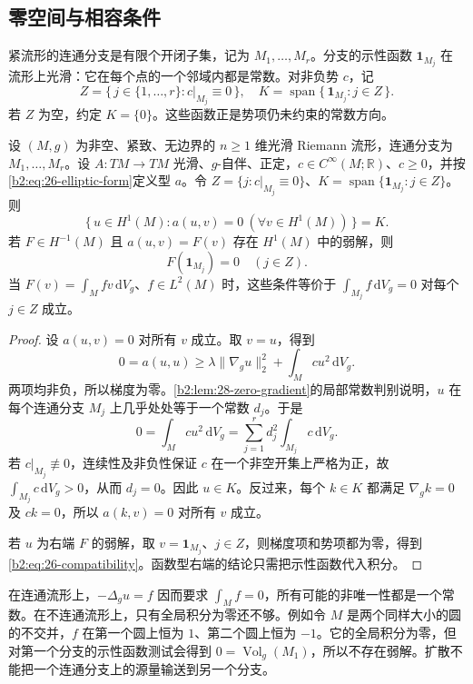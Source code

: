 \subsection{零空间与相容条件}
\label{b2:subsec:260302}

紧流形的连通分支是有限个开闭子集，记为 \(M_1,\ldots,M_r\)。分支的示性函数 \(\mathbf1_{M_j}\) 在流形上光滑：它在每个点的一个邻域内都是常数。对非负势 \(c\)，记
\[
 Z=\{\,j\in\{1,\ldots,r\}:c|_{M_j}\equiv0\,\},
 \quad
 K=\operatorname{span}\{\,\mathbf1_{M_j}:j\in Z\,\}.
\]
若 \(Z\) 为空，约定 \(K=\{0\}\)。这些函数正是势项仍未约束的常数方向。

\begin{proposition}[零空间与相容条件]
\label{b2:prop:26-kernel-compatibility}
设 \((M,g)\) 为非空、紧致、无边界的 \(n\geq1\) 维光滑 Riemann 流形，连通分支为 \(M_1,\ldots,M_r\)。设 \(A:TM\to TM\) 光滑、\(g\)-自伴、正定，\(c\in C^\infty(M;\mathbb R)\)、\(c\geq0\)，并按\eqref{b2:eq:26-elliptic-form}定义型 \(a\)。令
\(Z=\{j:c|_{M_j}\equiv0\}\)、\(K=\operatorname{span}\{\mathbf1_{M_j}:j\in Z\}\)。则
\[
 \{\,u\in H^1(M):a(u,v)=0\ (\forall v\in H^1(M))\,\}=K.
\]
若 \(F\in H^{-1}(M)\) 且 \(a(u,v)=F(v)\) 存在 \(H^1(M)\) 中的弱解，则
\begin{equation}
\label{b2:eq:26-compatibility}
 F(\mathbf1_{M_j})=0\quad(j\in Z).
\end{equation}
当 \(F(v)=\int_Mfv\,\mathrm dV_g\)、\(f\in L^2(M)\) 时，这些条件等价于
\(\int_{M_j}f\,\mathrm dV_g=0\) 对每个 \(j\in Z\) 成立。
\end{proposition}
\begin{proof}
设 \(a(u,v)=0\) 对所有 \(v\) 成立。取 \(v=u\)，得到
\[
 0=a(u,u)
 \geq\lambda\|\nabla_g u\|_2^2+\int_Mcu^2\,\mathrm dV_g.
\]
两项均非负，所以梯度为零。\cref{b2:lem:28-zero-gradient}的局部常数判别说明，\(u\) 在每个连通分支 \(M_j\) 上几乎处处等于一个常数 \(d_j\)。于是
\[
 0=\int_Mcu^2\,\mathrm dV_g
   =\sum_{j=1}^r d_j^2\int_{M_j}c\,\mathrm dV_g.
\]
若 \(c|_{M_j}\not\equiv0\)，连续性及非负性保证 \(c\) 在一个非空开集上严格为正，故 \(\int_{M_j}c\,\mathrm dV_g>0\)，从而 \(d_j=0\)。因此 \(u\in K\)。反过来，每个 \(k\in K\) 都满足 \(\nabla_g k=0\) 及 \(ck=0\)，所以 \(a(k,v)=0\) 对所有 \(v\) 成立。

若 \(u\) 为右端 \(F\) 的弱解，取 \(v=\mathbf1_{M_j}\)、\(j\in Z\)，则梯度项和势项都为零，得到\eqref{b2:eq:26-compatibility}。函数型右端的结论只需把示性函数代入积分。
\end{proof}

在连通流形上，\(-\Delta_g u=f\) 因而要求 \(\int_Mf=0\)，所有可能的非唯一性都是一个常数。在不连通流形上，只有全局积分为零还不够。例如令 \(M\) 是两个同样大小的圆的不交并，\(f\) 在第一个圆上恒为 \(1\)、第二个圆上恒为 \(-1\)。它的全局积分为零，但对第一个分支的示性函数测试会得到 \(0=\operatorname{Vol}_g(M_1)\)，所以不存在弱解。扩散不能把一个连通分支上的源量输送到另一个分支。

